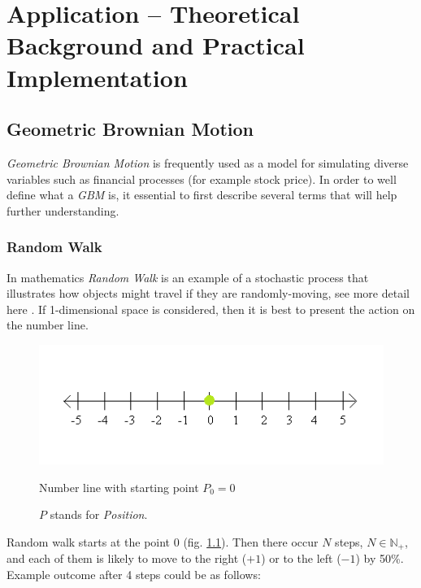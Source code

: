 \chapter{Application -- Theoretical Background and Practical Implementation}

\section{Geometric Brownian Motion}
    \textit{Geometric Brownian Motion} is frequently used as a model for simulating diverse variables such as financial processes (for example stock price). In order to well define what a \textit{GBM} is, it essential to first describe several terms that will help further understanding.
    
    \subsection{Random Walk}
        In mathematics \textit{Random Walk} is an example of a stochastic process that illustrates how objects might travel if they are randomly-moving, see more detail here \cite{randomWalk}.
        If 1-dimensional space is considered, then it is best to present the action on the number line.
        \begin{figure}[H]
            \centering
            \includegraphics{img/numberLine.png}
            \caption{Number line with starting point $P_0=0$}
            \caption*{$P$ stands for \textit{Position}.}
            \label{fig:numberLine_start}
        \end{figure}
        Random walk starts at the point 0 (fig. \ref{fig:numberLine_start}). Then there occur $N$ steps, $N \in \mathbb{N}_+$, and each of them is likely to move to the right ($+1$) or to the left ($-1$) by 50\%. Example outcome after 4 steps could be as follows:
        
